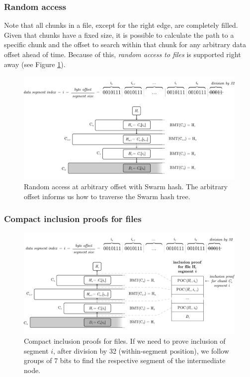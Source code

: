 \subsubsection{Random access}

Note that all chunks in a file, except for the right edge, are completely filled. Given that chunks have a fixed size, it is possible to calculate the path to a specific chunk and the offset to search within that chunk for any arbitrary data offset ahead of time. Because of this, \emph{random access to files} is supported right away (see Figure \ref{fig:random-access}).


\begin{figure}[htbp]
\centering
\includegraphics[width=\textwidth]{fig/random-access.pdf}
\caption[Random access at arbitrary offset with Swarm hash \statusgreen]{Random access at arbitrary offset with Swarm hash. The arbitrary offset informs us how to traverse the Swarm hash tree.}
\label{fig:random-access}
\end{figure}

\subsubsection{Compact inclusion proofs for files}


\begin{figure}[htbp]
\centering
\includegraphics[width=\textwidth]{fig/file-inclusion.pdf}
\caption[Compact inclusion proofs for files \statusgreen]{Compact inclusion proofs for files. If we need to prove inclusion of segment   $i$, after division by 32 (within-segment position), we follow groups of 7 bits to find the respective segment of the intermediate node.}
\label{fig:file-inclusion}
\end{figure}


